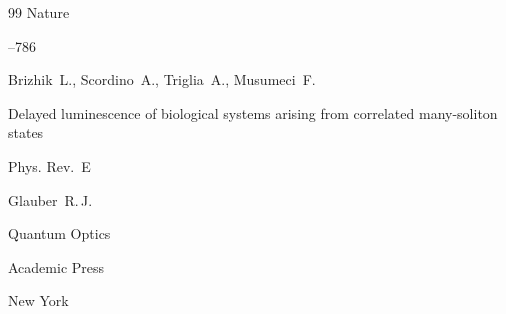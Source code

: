\begin{thebibliography}{99}
\jour Nature



--786











\by Brizhik~L., Scordino~A., Triglia~A., Musumeci~F.

\paper Delayed luminescence of biological systems arising from correlated many-soliton states

\jour Phys. Rev.~E 













\by  Glauber~R.\,J. 

\book Quantum Optics

\publ Academic Press

\publaddr New York









\end{thebibliography}



\vskip1mm \par{\footnotesize

\hskip6.5cm \theengdate \par

\hskip6.5cm\theengrevdate\par}



\renewcommand{\baselinestretch}{.9}



\newpage



\Russian



\renewcommand{\refname}{¡»¡À»Œ√–¿‘»◊≈— »… —œ»—Œ }







%

%

